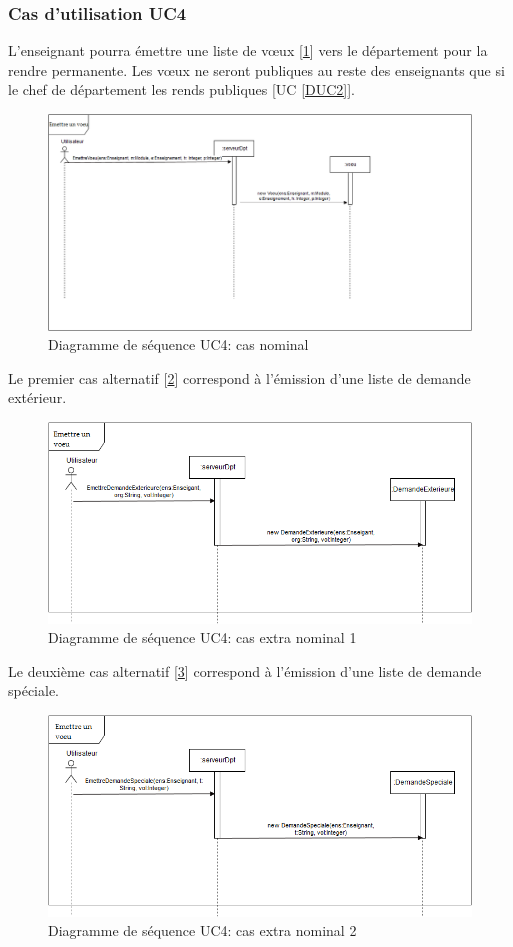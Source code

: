 \documentclass[a4paper,11pt]{article}
\newcommand{\br}{\\\mbox{}}
\begin{document}
\subsubsection{Cas d’utilisation UC4}
L'enseignant pourra émettre une liste de vœux [\ref{DUC4}] vers le département pour la rendre permanente. Les vœux ne seront publiques au reste des enseignants que si le chef de département les rends publiques [UC \ref{DUC2}].\br
\begin{figure}
\centering
\includegraphics[scale=0.5]{Seq_UC4.png}
\caption{Diagramme de séquence UC4: cas nominal}
\label{DUC4}
\end{figure}
Le premier cas alternatif [\ref{DUC4_}] correspond à l'émission d'une liste de demande extérieur.\br
\begin{figure}
\centering
\includegraphics[scale=0.5]{Seq_UC4_.png}
\caption{Diagramme de séquence UC4: cas extra nominal 1}
\label{DUC4_}
\end{figure}
Le deuxième cas alternatif [\ref{DUC4__}] correspond à l'émission d'une liste de demande spéciale.\br
\begin{figure}
\centering
\includegraphics[scale=0.5]{Seq_UC4__.png}
\caption{Diagramme de séquence UC4: cas extra nominal 2}
\label{DUC4__}
\end{figure}
\end{document}
